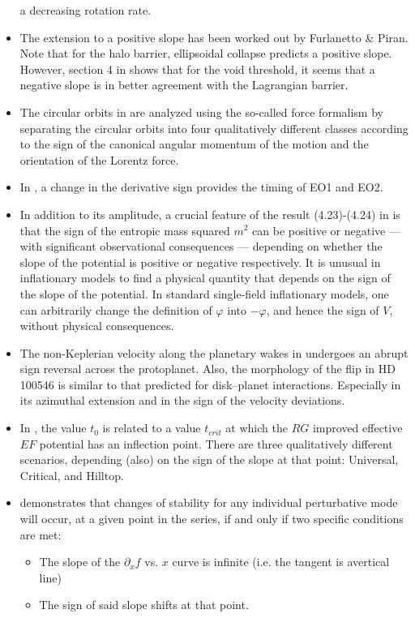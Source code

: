 \documentclass[11pt]{book}
\begin{document}
\begin{itemize}
a decreasing rotation rate.
\item The extension to a positive slope has been worked out by Furlanetto
\& Piran. Note that for the halo barrier, ellipsoidal collapse predicts
a positive slope. However, section 4 in \cite{achitouv2015testing}
shows that for the void threshold, it seems that a negative slope
is in better agreement with the Lagrangian barrier.
\item The circular orbits in \cite{tursunov2016circular}
are analyzed using the so-called force formalism by separating the
circular orbits into four qualitatively different classes according
to the sign of the canonical angular momentum of the motion and the
orientation of the Lorentz force.
\item In \cite{mishin201727},
a change in the derivative sign provides the timing of EO1 and EO2.
\item In addition to its amplitude, a crucial feature of the result (4.23)-(4.24)
in \cite{garcia2018primordial}
is that the sign of the entropic mass squared $m^{2}$ can be positive
or negative --- with significant observational consequences ---
depending on whether the slope of the potential is positive or negative
respectively. It is unusual in inflationary models to find a physical
quantity that depends on the sign of the slope of the potential. In
standard single-field inflationary models, one can arbitrarily change
the definition of $\varphi$ into $-\varphi$, and hence the sign
of $V$, without physical consequences.
\item The non-Keplerian velocity along the planetary wakes in \cite{casassus2019kinematic}
undergoes an abrupt sign reversal across the protoplanet. Also, the
morphology of the flip in HD 100546 is similar to that predicted for
disk--planet interactions. Especially in its azimuthal extension
and in the sign of the velocity deviations.
\item In \cite{steinwachs2020higgs}, the value $t_{0}$ is related
to a value $t_{crit}$ at which the $RG$ improved effective $EF$
potential has an inflection point. There are three qualitatively different
scenarios, depending (also) on the sign of the slope at that point:
Universal, Critical, and Hilltop.
\item \cite{arguelles2021formation}
demonstrates that changes of stability for any individual perturbative
mode will occur, at a given point in the series, if and only if two
specific conditions are met:
\begin{itemize}
\item The slope of the $\partial_{x}f$ vs. $x$ curve is infinite (i.e.
the tangent is avertical line)
\item The sign of said slope shifts at that point.
\end{itemize}
\end{itemize}
\end{document}
